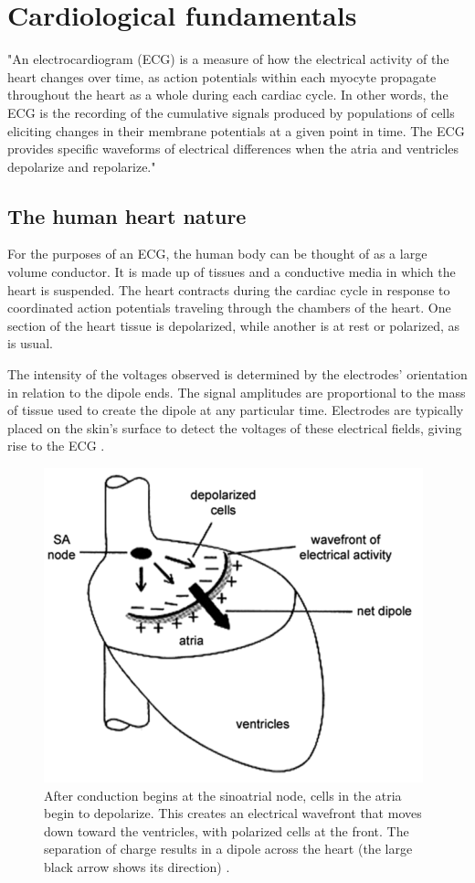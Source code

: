 \chapter{Cardiological fundamentals} \label{chap2}

\cite{ecg1} "An electrocardiogram (ECG) is a measure of how the electrical activity of the heart changes over time, as action potentials within each myocyte propagate throughout the heart as a whole during each cardiac cycle. In other words, the ECG is the recording of the cumulative signals produced by populations of cells eliciting changes in their membrane potentials at a given point in time. The ECG provides specific waveforms of electrical differences when the atria and ventricles depolarize and repolarize."

\section{The human heart nature} \label{heart_nature}

For the purposes of an ECG, the human body can be thought of as a large volume conductor. It is made up of tissues and a conductive media in which the heart is suspended. The heart contracts during the cardiac cycle in response to coordinated action potentials traveling through the chambers of the heart. One section of the heart tissue is depolarized, while another is at rest or polarized, as is usual. 

The intensity of the voltages observed is determined by the electrodes' orientation in relation to the dipole ends. The signal amplitudes are proportional to the mass of tissue used to create the dipole at any particular time. Electrodes are typically placed on the skin's surface to detect the voltages of these electrical fields, giving rise to the ECG \cite{ecg1}.


\begin{figure}[H]
\centering
\includegraphics[scale=0.7]{img/heart_nature.PNG}
\caption{After conduction begins at the sinoatrial node, cells in the atria begin to depolarize. This creates an electrical wavefront that moves down toward the ventricles, with polarized cells at the front. The separation of charge results in a dipole across the heart (the large black arrow shows its direction) \cite{ecg1}.}
\label{fig:heart_nat}
\end{figure}



